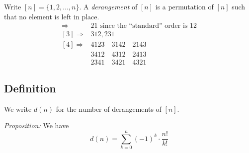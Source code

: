 \documentclass[11pt]{article}
\begin{document}
    Write \([n] = \{1,2, \dots, n\}\). A \emph{derangement} of \([n]\) is a permutation of \([n]\) such that no element is left in place.
    \begin{align*}
        [2] \Rightarrow &21 \text{ since the ``standard'' order is } 12 \\
        [3] \Rightarrow &312, 231 \\
        [4] \Rightarrow &4123 \quad 3142 \quad 2143 \\
             &3412 \quad 4312 \quad 2413 \\
             &2341 \quad 3421 \quad 4321
    \end{align*}

    \subsection{Definition}

    We write \(d(n)\) for the number of derangements of \([n]\).

    \vspace{1em}

    \emph{Proposition:} We have \[d(n) = \sum_{k=0}^{n} (-1)^k \cdot \frac{n!}{k!}\]
\end{document}
